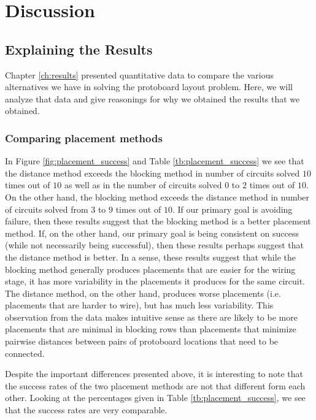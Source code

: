 
\chapter{Discussion}
\label{ch:discussion}

\section{Explaining the Results}

Chapter \ref{ch:results} presented quantitative data to compare the various
alternatives we have in solving the protoboard layout problem. Here, we will
analyze that data and give reasonings for why we obtained the results
that we obtained.

\subsection{Comparing placement methods}

In Figure \ref{fig:placement_success} and Table \ref{tb:placement_success} we
see that the distance method exceeds the blocking method in number of circuits
solved $10$ times out of $10$ as well as in the number of circuits solved $0$
to $2$ times out of $10$. On the other hand, the blocking method exceeds the
distance method in number of circuits solved from $3$ to $9$ times out
of $10$. If our primary goal is avoiding failure, then these results suggest
that the blocking method is a better placement method. If, on the other hand,
our primary goal is being consistent on success (while not necessarily being
successful), then these results perhaps suggest that the distance method is
better. In a sense, these results suggest that while the blocking method
generally produces placements that are easier for the wiring stage, it has more
variability in the placements it produces for the same circuit. The distance
method, on the other hand, produces worse placements (i.e. placements that are
harder to wire), but has much less variability. This observation from the data
makes intuitive sense as there are likely to be more placements that are minimal
in blocking rows than placements that minimize pairwise distances between pairs
of protoboard locations that need to be connected.

Despite the important differences presented above, it is interesting to note
that the
success rates of the two placement methods are not that different form each
other. Looking at the percentages given in Table \ref{tb:placement_success}, we
see that the success rates are very comparable.

